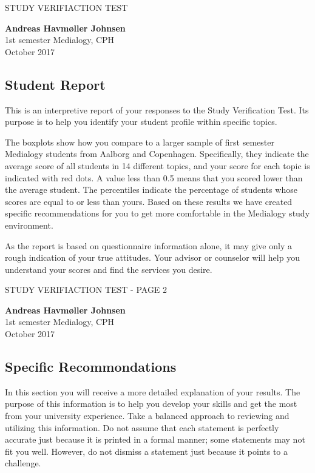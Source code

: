 \documentclass[]{article}
\title{}
\author{}
\date{}
\begin{document}
STUDY VERIFIACTION TEST

\textbf{Andreas Havmøller Johnsen}\\
1st semester Medialogy, CPH\\
October 2017

\subsection{Student Report}\label{student-report}

This is an interpretive report of your responses to the Study
Verification Test. Its purpose is to help you identify your student
profile within specific topics.

The boxplots show how you compare to a larger sample of first semester
Medialogy students from Aalborg and Copenhagen. Specifically, they
indicate the average score of all students in 14 different topics, and
your score for each topic is indicated with red dots. A value less than
0.5 means that you scored lower than the average student. The
percentiles indicate the percentage of students whose scores are equal
to or less than yours. Based on these results we have created specific
recommendations for you to get more comfortable in the Medialogy study
environment.

As the report is based on questionnaire information alone, it may give
only a rough indication of your true attitudes. Your advisor or
counselor will help you understand your scores and find the services you
desire.

\pagebreak

STUDY VERIFIACTION TEST - PAGE 2

\textbf{Andreas Havmøller Johnsen}\\
1st semester Medialogy, CPH\\
October 2017

\subsection{Specific Recommondations}\label{specific-recommondations}

In this section you will receive a more detailed explanation of your
results. The purpose of this information is to help you develop your
skills and get the most from your university experience. Take a balanced
approach to reviewing and utilizing this information. Do not assume that
each statement is perfectly accurate just because it is printed in a
formal manner; some statements may not fit you well. However, do not
dismiss a statement just because it points to a challenge.
\end{document}
